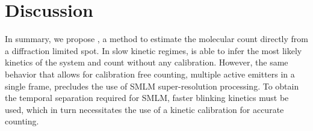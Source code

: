 \section{Discussion} \label{discussion}

In summary, we propose \ours, a method to estimate the molecular count directly from 
a diffraction limited spot. 
%
  In slow kinetic regimes, \ours is able to infer the 
  most likely kinetics of the system and count without any calibration. 
  However, the same behavior that allows for calibration free counting, 
  multiple active emitters in a single frame,
  precludes the use of SMLM super-resolution processing. 
  To obtain the temporal separation required for SMLM, faster blinking kinetics must be used, 
  which in turn necessitates the use of a kinetic calibration for accurate counting.


